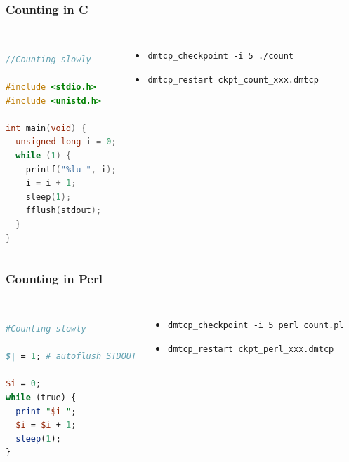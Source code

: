 \documentclass[compress]{beamer}
\begin{document}
\begin{frame}[fragile]
\frametitle{Counting in C}

\begin{columns}[t]

\begin{lstlisting}[basicstyle=\ttfamily, language=C, showstringspaces=false]

//Counting slowly

#include <stdio.h>
#include <unistd.h>

int main(void) {
  unsigned long i = 0;
  while (1) {
    printf("%lu ", i);
    i = i + 1;
    sleep(1);
    fflush(stdout);
  } 
} 

\end{lstlisting}


\begin{itemize}
\item \texttt{dmtcp\_checkpoint -i 5 ./count}
\item \texttt{dmtcp\_restart ckpt\_count\_xxx.dmtcp}
\end{itemize}

\end{columns}

\end{frame}


\begin{frame}[fragile]
\frametitle{Counting in Perl}

\begin{columns}[t]

\begin{lstlisting}[basicstyle=\ttfamily, language=Perl, showstringspaces=false]

#Counting slowly

$| = 1; # autoflush STDOUT

$i = 0;
while (true) {
  print "$i ";
  $i = $i + 1;
  sleep(1);
}
\end{lstlisting}


\begin{itemize}
\item \texttt{dmtcp\_checkpoint -i 5 perl count.pl}
\item \texttt{dmtcp\_restart ckpt\_perl\_xxx.dmtcp}
\end{itemize}

\end{columns}


\end{frame}
\end{document}
